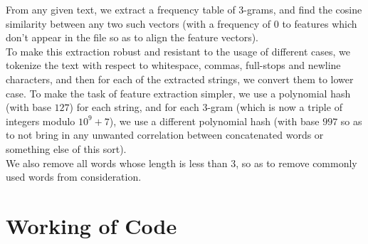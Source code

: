 \documentclass{article}
\begin{document}
From any given text, we extract a frequency table of $3$-grams, and find the cosine similarity between any two such vectors (with a frequency of 0 to features which don't appear in the file so as to align the feature vectors).\\
To make this extraction robust and resistant to the usage of different cases, we tokenize the text with respect to whitespace, commas, full-stops and newline characters, and then for each of the extracted strings, we convert them to lower case.
To make the task of feature extraction simpler, we use a polynomial hash (with base $127$) for each string, and for each $3$-gram (which is now a triple of integers modulo $10^9 + 7$), we use a different polynomial hash (with base $997$ so as to not bring in any unwanted correlation between concatenated words or something else of this sort).\\
We also remove all words whose length is less than 3, so as to remove commonly used words from consideration.

\section*{Working of Code}
\end{document}
